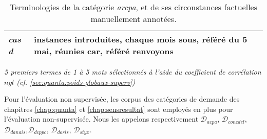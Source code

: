 \begin{table}[ht]
\begin{tabular}{|l|p{}|}
		\\ \hline
		\textit{cas d} & instances introduites,
		chaque mois sous,
		référé du 5 mai,
		réunies car,
		référé renvoyons
		\\ \hline
	\end{tabular}

	\textit{5 premiers termes de 1 à 5 mots sélectionnés à l'aide du coefficient de corrélation $ngl$ (cf. \ref{sec:quanta:poids-globaux-superv})}
	\caption{Terminologies  de la catégorie \textit{arcpa}, et de ses circonstances factuelles manuellement annotées.}\label{tab:similarite:terminologie-resp_avocat}
\end{table}

Pour l'évaluation non supervisée, les corpus des catégories de demande des chapitres \ref{chap:quanta} et \ref{chap:sensresultat} sont employés en plus pour l'évaluation non-supervisée. Nous les appelons respectivement $\mathcal{D}_{acpa}$, $\mathcal{D}_{concdel}$, $\mathcal{D}_{danais}$,$\mathcal{D}_{dcppc}$, $\mathcal{D}_{doris}$, $\mathcal{D}_{styx}$.

